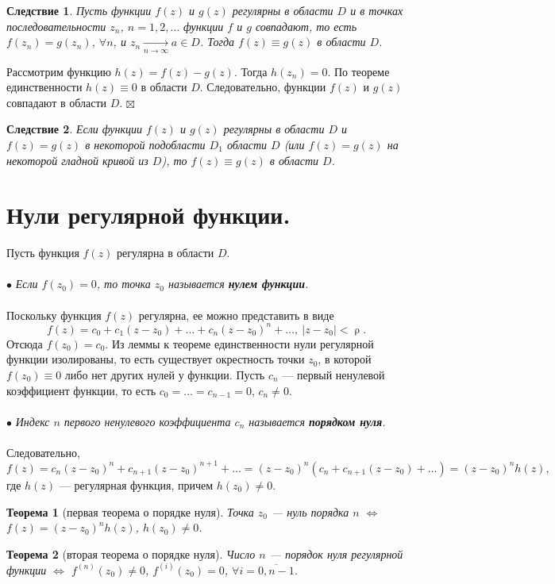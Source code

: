 \documentclass[a4paper, 12pt]{article}
\newenvironment{Proof} %
{\par\noindent{$\blacklozenge$}} %
{\hfill$\scriptstyle\boxtimes$}
\renewcommand{\rho}{\uprho}
\newtheorem*{theorem}{Теорема}
\newtheorem*{cor}{Следствие}
\begin{document}
\begin{cor}
	Пусть функции $f(z)$ и $g(z)$ регулярны в области $D$ и в точках последовательности $z_n$, $n = 1,2,\ldots$ функции $f$ и $g$ совпадают, то есть $f(z_n) = g(z_n)$, $\forall n$, и $z_n\underset{n\to \infty}{\longrightarrow} a \in D$. Тогда $f(z)\equiv g(z)$ в области $D$. 
\end{cor}\begin{Proof}
Рассмотрим функцию $h(z) = f(z) - g(z)$. Тогда $h(z_n) = 0$. По теореме единственности $h(z) \equiv 0$ в области $D$. Следовательно, функции $f(z)$ и $g(z)$ совпадают в области $D$.
\end{Proof}
\begin{cor}
	Если функции $f(z)$ и $g(z)$ регулярны в области $D$ и $f(z) = g(z)$ в некоторой подобласти $D_1$ области $D$ (или $f(z) = g(z)$ на некоторой гладной кривой из $D$), то $f(z) \equiv g(z)$ в области $D$.
\end{cor}
\section{Нули регулярной функции.}
Пусть функция $f(z)$ регулярна в области $D$.\\\\
$\bullet$ \textit{Если $f(z_0) = 0$, то точка $z_0$ называется \textbf{нулем функции}.}\\\\
Поскольку функция $f(z)$ регулярна, ее можно представить в виде $$f(z) = c_0 + c_1(z-z_0) + \ldots + c_n(z-z_0)^n + \ldots,\ |z-z_0|<\rho.$$
Отсюда $f(z_0) = c_0$. Из леммы к теореме единственности нули регулярной функции изолированы, то есть существует окрестность точки $z_0$, в которой $f(z_0) \equiv 0$ либо нет других нулей у функции. Пусть $c_n$ --- первый ненулевой коэффициент функции, то есть $c_0 = \ldots = c_{n-1} = 0$, $c_n \ne 0$. \\\\
$\bullet$ \textit{Индекс $n$ первого ненулевого коэффициента $c_n$ называется \textbf{порядком нуля}.}\\\\
Следовательно, $$f(z) = c_n(z-z_0)^n + c_{n+1}(z-z_0)^{n+1} + \ldots = (z-z_0)^n(c_n + c_{n+1}(z-z_0) + \ldots) = (z-z_0)^n h(z),$$
где $h(z)$ --- регулярная функция, причем $h(z_0)\ne 0$.
\begin{theorem}
	[первая теорема о порядке нуля]
	Точка $z_0$ --- нуль порядка $n$ $\Longleftrightarrow$ $f(z) = (z-z_0)^nh(z)$, $h(z_0) \ne 0$.
\end{theorem}\begin{theorem}
[вторая теорема о порядке нуля]
Число $n$ --- порядок нуля регулярной функции $\Longleftrightarrow$ $f^{(n)}(z_0)\ne 0$, $f^{(i)}(z_0) =0$, $\forall i = \overline{0,n-1}$. 
\end{theorem}
\end{document}
